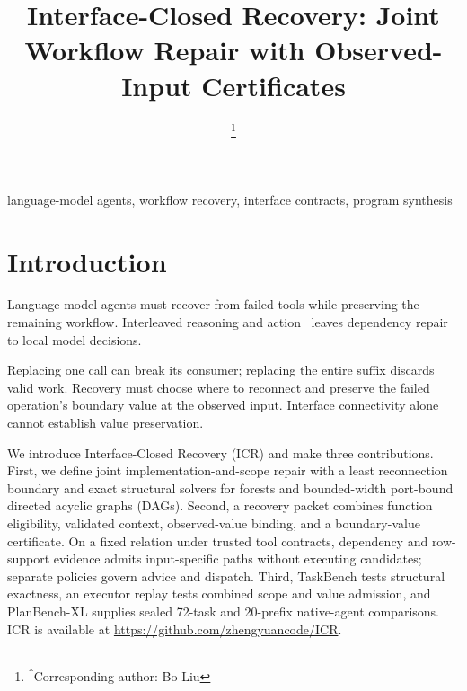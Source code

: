 \documentclass[conference]{IEEEtran}
\begin{document}
\title{Interface-Closed Recovery: Joint Workflow Repair with Observed-Input Certificates}
\author{%
\and
{}
\and
{}
\and
{}
\thanks{\textsuperscript{*}Corresponding author: Bo Liu}}
\maketitle
\begin{abstract}

\end{abstract}
\begin{IEEEkeywords}
language-model agents, workflow recovery, interface contracts, program synthesis
\end{IEEEkeywords}

\section{Introduction}
Language-model agents must recover from failed tools while preserving the
remaining workflow. Interleaved reasoning and action~\cite{react} leaves
dependency repair to local model decisions.

Replacing one call can break its consumer; replacing the entire suffix discards
valid work. Recovery must choose where to reconnect and preserve the failed
operation's boundary value at the observed input. Interface connectivity alone
cannot establish value preservation.

We introduce Interface-Closed Recovery (ICR) and make three contributions.
First, we define joint implementation-and-scope repair with a least
reconnection boundary and exact structural solvers for forests and bounded-width
port-bound directed acyclic graphs (DAGs). Second, a recovery packet combines
function eligibility, validated context, observed-value binding, and a
boundary-value certificate. On a fixed relation under trusted tool contracts,
dependency and row-support evidence admits input-specific paths without
executing candidates; separate policies govern advice and dispatch. Third,
TaskBench tests structural exactness, an executor replay tests combined scope
and value admission, and PlanBench-XL supplies sealed 72-task and 20-prefix
native-agent comparisons.
ICR is available at \url{https://github.com/zhengyuancode/ICR}.
\end{document}
